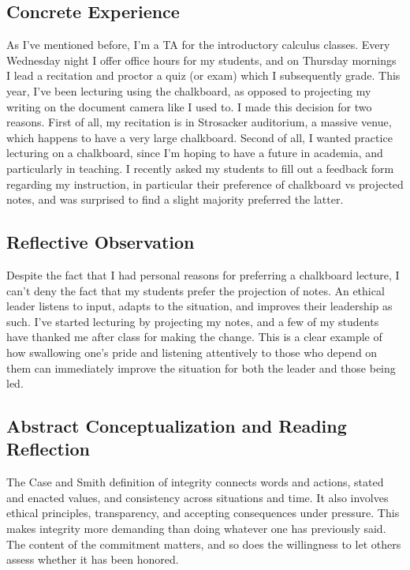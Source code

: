 \documentclass[12pt,stu,biblatex]{apa7}
\begin{document}
\subsection{Concrete Experience}
As I've mentioned before, I'm a TA for the introductory calculus classes.
Every Wednesday night I offer office hours for my students, and on Thursday mornings I lead a recitation and proctor a quiz (or exam) which I subsequently grade.
This year, I've been lecturing using the chalkboard, as opposed to projecting my writing on the document camera like I used to.
I made this decision for two reasons.
First of all, my recitation is in Strosacker auditorium, a massive venue, which happens to have a very large chalkboard.
Second of all, I wanted practice lecturing on a chalkboard, since I'm hoping to have a future in academia, and particularly in teaching.
I recently asked my students to fill out a feedback form regarding my instruction, in particular their preference of chalkboard vs projected notes, and was surprised to find a slight majority preferred the latter.

\subsection{Reflective Observation}
Despite the fact that I had personal reasons for preferring a chalkboard lecture, I can't deny the fact that my students prefer the projection of notes.
An ethical leader listens to input, adapts to the situation, and improves their leadership as such.
I've started lecturing by projecting my notes, and a few of my students have thanked me after class for making the change.
This is a clear example of how swallowing one's pride and listening attentively to those who depend on them can immediately improve the situation for both the leader and those being led.

\subsection{Abstract Conceptualization and Reading Reflection}
The Case and Smith definition of integrity \parencite{caseSmith2013integrity} connects words and actions, stated and enacted values, and consistency across situations and time.
It also involves ethical principles, transparency, and accepting consequences under pressure.
This makes integrity more demanding than doing whatever one has previously said.
The content of the commitment matters, and so does the willingness to let others assess whether it has been honored.
\end{document}
